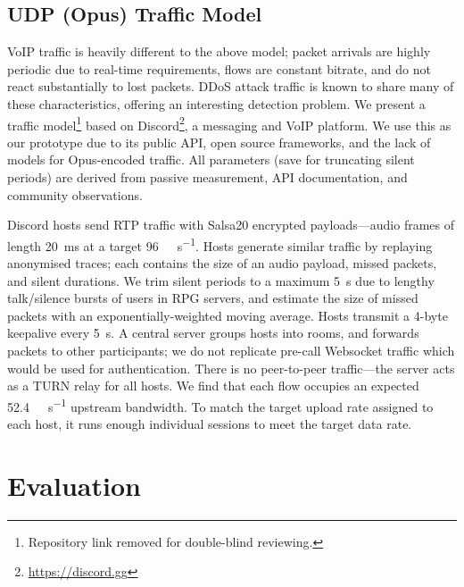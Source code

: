 \documentclass[10pt, times, conference, letterpaper]{IEEEtran}
\begin{document}
\subsection{UDP (Opus) Traffic Model}
VoIP traffic is heavily different to the above model; packet arrivals are highly periodic due to real-time requirements, flows are constant bitrate, and do not react substantially to lost packets.
DDoS attack traffic is known to share many of these characteristics, offering an interesting detection problem.
We present a traffic model\footnote{Repository link removed for double-blind reviewing.} based on Discord\footnote{\url{https://discord.gg}}, a messaging and VoIP platform.
We use this as our prototype due to its public API, open source frameworks, and the lack of models for Opus-encoded traffic.
All parameters (save for truncating silent periods) are derived from passive measurement, API documentation, and community observations.

Discord hosts send RTP traffic with Salsa20 encrypted payloads---audio frames of length \SI{20}{\milli\second} at a target \SI{96}{\kilo\bit\per\second}.
Hosts generate similar traffic by replaying anonymised traces; each contains the size of an audio payload, missed packets, and silent durations.
We trim silent periods to a maximum \SI{5}{\second} due to lengthy talk/silence bursts of users in RPG servers, and estimate the size of missed packets with an exponentially-weighted moving average.
Hosts transmit a 4-byte keepalive every \SI{5}{\second}.
A central server groups hosts into rooms, and forwards packets to other participants; we do not replicate pre-call Websocket traffic which would be used for authentication.
There is no peer-to-peer traffic---the server acts as a TURN relay for all hosts.
We find that each flow occupies an expected \SI{52.4}{\kilo\bit\per\second} upstream bandwidth.
To match the target upload rate assigned to each host, it runs enough individual sessions to meet the target data rate.


\section{Evaluation}
\end{document}
